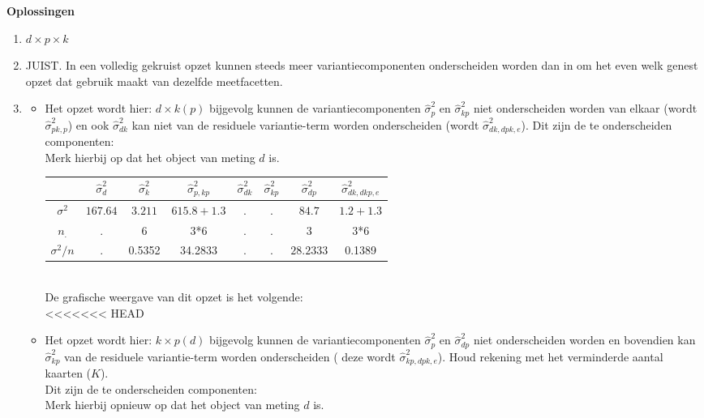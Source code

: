 \OPLOSSING
{
\textbf{Oplossingen}
\begin{enumerate}
\item $d \times p \times k$

\item JUIST. In een volledig gekruist opzet kunnen steeds meer variantiecomponenten onderscheiden worden dan in om het even welk genest opzet dat gebruik maakt van dezelfde meetfacetten. 
\item
\begin{itemize}
	\item Het opzet wordt hier: $d \times k\left(p\right)$ bijgevolg kunnen de variantiecomponenten $\hat{\sigma}^2_p$ en $\hat{\sigma}^2_{kp}$ niet onderscheiden worden van elkaar (wordt $\hat{\sigma}^2_{pk,p}$) en ook $\hat{\sigma}^2_{dk}$ kan niet van de residuele variantie-term worden onderscheiden (wordt $\hat{\sigma}^2_{dk, dpk,e}$). Dit zijn de te onderscheiden componenten:\\ Merk hierbij op dat het object van meting $d$ is. \\
	\begin{tabular}{|c|c|c|c|c|c|c|c|} \hline
	 & $ \hat{\sigma}^2_{d}$ & $ \hat{\sigma}^2_{k} $& $ \hat{\sigma}^2_{p,kp} $ & $ \hat{\sigma}^2_{dk}$ & $\hat{\sigma}^2_{kp} $ & $ \hat{\sigma}^2_{dp} $& $ \hat{\sigma}^2_{dk, dkp, e} $ \\ \hline
	$\sigma^2$  			& $ 167.64 $ 			& $ 3.211 $ 			& $615.8+1.3  $ 			& $ .$				 & $. $	& $ 84.7 $	 & $ 1.2 + 1.3  $ \\
	$n_.$				& .						& 6						& 3*6				 		& $ .$		  		 & $. $	& $ 3 $		 &  3*6 \\ \hline
	$\sigma^2 / n$ 		& .						& 0.5352				& 34.2833				 	& $ .$			  	 & $. $	& $ 28.2333 $& 0.1389 \\ \hline
	\end{tabular} \\
	De grafische weergave van dit opzet is het volgende:\\
	
	
<<<<<<< HEAD
	\item Het opzet wordt hier: $k \times p(d)$ bijgevolg kunnen de variantiecomponenten $\hat{\sigma}^2_p$ en $\hat{\sigma}^2_{dp}$ niet onderscheiden worden en bovendien kan $\hat{\sigma}^2_{kp}$ van de residuele variantie-term worden onderscheiden ( deze wordt $\hat{\sigma}^2_{kp, dpk, e}$). Houd rekening met het verminderde aantal kaarten ($K$).\\Dit zijn de te onderscheiden componenten:\\ Merk hierbij opnieuw op dat het object van meting $d$ is. \\


\end{itemize}
\end{enumerate}}
